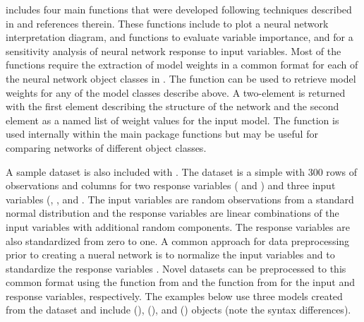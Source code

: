 \documentclass[article,shortnames]{jss}\usepackage[]{graphicx}\usepackage[]{color}
\begin{document}
 includes four main functions that were developed following techniques described in \citet{Olden02} and references therein.  These functions include  to plot a neural network interpretation diagram,  and  functions to evaluate variable importance, and  for a sensitivity analysis of neural network response to input variables.  Most of the functions require the extraction of model weights in a common format for each of the neural network object classes in .  The  function can be used to retrieve model weights for any of the model classes describe above.  A two-element  is returned with the first element describing the structure of the network and the second element as a named list of weight values for the input model.  The function is used internally within the main package functions but may be useful for comparing networks of different object classes.

A sample dataset is also included with .  The  dataset is a simple  with 300 rows of observations and columns for two response variables ( and ) and three input variables (, , and .  The input variables are random observations from a standard normal distribution and the response variables are linear combinations of the input variables with additional random components.  The response variables are also standardized from zero to one.  A common approach for data preprocessing prior to creating a nueral network is to normalize the input variables and to standardize the response variables \citep{Lek00,Olden02}.  Novel datasets can be preprocessed to this common format using the  function from  and the  function from  for the input and response variables, respectively.  The examples below use three models created from the  dataset and include  (),  (), and  () objects (note the syntax differences).
\end{document}
